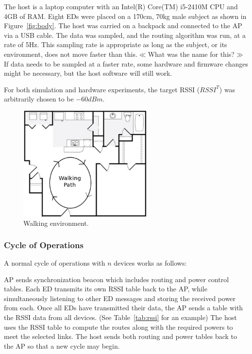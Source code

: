 \documentclass{article}
\begin{document}
The host is a laptop computer with an Intel(R) Core(TM) i5-2410M CPU and 4GB of RAM. Eight EDs were placed on a 170cm, 70kg male subject as shown in Figure~\ref{fig:body}. The host was carried on a backpack and connected to the AP via a USB cable. The data was sampled, and the routing algorithm was run, at a rate of 5Hz. This sampling rate is appropriate as long as the subject, or its environment, does not move faster than this.$\ll$What was the name for this?$\gg$ If data needs to be sampled at a faster rate, some hardware and firmware changes might be necessary, but the host software will still work.

For both simulation and hardware experiments, the target RSSI ($RSSI^T$) was arbitrarily chosen to be $-60 dBm$.

\begin{figure}[!htb]
\begin{center}
\includegraphics[width=0.6\textwidth]{figures/floorplan.pdf}
\end{center}
\caption{Walking environment.}
\label{fig:floorplan}
\end{figure}

\subsubsection{Cycle of Operations}\label{subsec:cycleofoperations}
A normal cycle of operations with $n$ devices works as follows:

\begin{algorithmic}[1]
\STATE AP sends synchronization beacon which includes routing and power control tables.
\STATE Each ED transmits its own RSSI table back to the AP, while simultaneously listening to other ED messages and storing the received power from each.
\STATE Once all EDs have transmitted their data, the AP sends a table with the RSSI data from all devices. (See Table~\ref{tab:rssi} for an example)
\STATE The host uses the RSSI table to compute the routes along with the required powers to meet the selected links.
\STATE The host sends both routing and power tables back to the AP so that a new cycle may begin.
\end{algorithmic}
\end{document}
